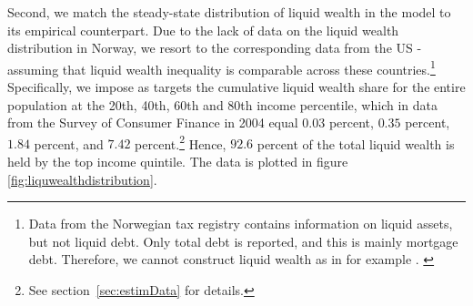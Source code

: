 \documentclass[11pt]{article}
\begin{document}
Second, we match the steady-state distribution of liquid wealth in the model to its empirical counterpart. Due to the lack of data on the liquid wealth distribution in Norway, we resort to the corresponding data from the US - assuming that liquid wealth inequality is comparable across these countries.\footnote{Data from the Norwegian tax registry contains information on liquid assets, but not liquid debt. Only total debt is reported, and this is mainly mortgage debt. Therefore, we cannot construct liquid wealth as in for example \citet{kaplan2014model}. \label{foot:liqwealth}} Specifically, we impose as targets the cumulative liquid wealth share for the entire population at the 20th, 40th, 60th and 80th income percentile, which in data from the Survey of Consumer Finance in 2004 equal $0.03$ percent, $0.35$ percent, $1.84$ percent, and $7.42$ percent.\footnote{See section~\ref{sec:estimData} for details.} Hence, $92.6$ percent of the total liquid wealth is held by the top income quintile. The data is plotted in figure \ref{fig:liquwealthdistribution}.
\end{document}
